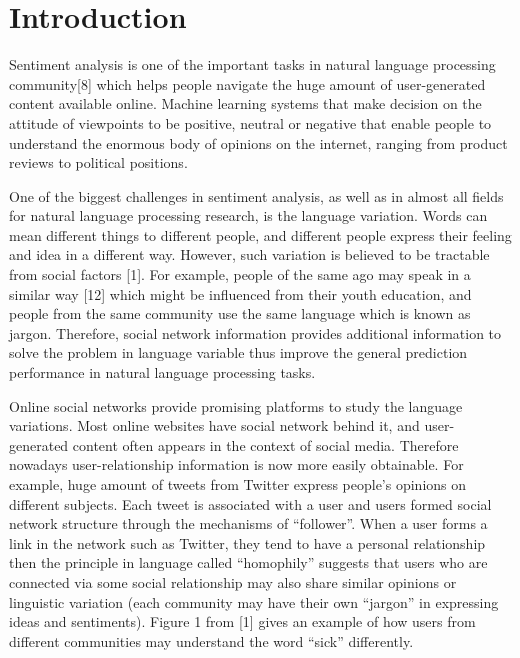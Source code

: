 
\section{Introduction}
Sentiment analysis is one of the important tasks in natural language processing community[8] which helps people navigate the huge amount of user-generated content available online. Machine learning systems that make decision on the attitude of viewpoints to be positive, neutral or negative that enable people to understand the enormous body of opinions on the internet, ranging from product reviews to political positions. 

One of the biggest challenges in sentiment analysis, as well as in almost all fields for natural language 
processing research, is the language variation. Words can mean different things to different people, 
and different people express their feeling and idea in a different way. However, such variation is believed
to be tractable from social factors [1]. For example, people of the same ago may speak in a
similar way [12] which might be influenced from their youth education, and people from the same community 
use the same language which is known as jargon. Therefore, social network information provides additional
information to solve the problem in language variable thus improve the general prediction performance
in natural language processing tasks.

Online social networks provide promising platforms to study the language variations. 
Most online websites have social network behind it, and user-generated content often appears in the context of social media. Therefore nowadays user-relationship information is now more easily obtainable. For example, huge amount of tweets from Twitter express people's opinions on different subjects. Each tweet is associated with a user and users formed social network structure through the mechanisms of ``follower''. When a user forms a link in the network such as Twitter, they tend to have a personal relationship then the principle in language called ``homophily'' suggests that users who are connected via some social relationship may also share similar opinions or linguistic variation (each community may have their own ``jargon'' in expressing ideas and sentiments). Figure 1 from [1] gives an example of how users from different communities may understand the word ``sick'' differently.

